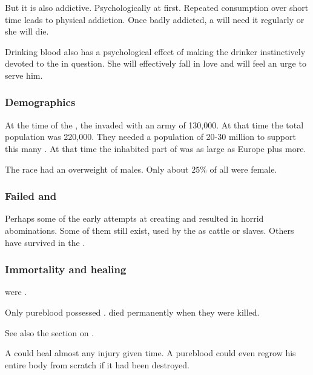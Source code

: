 But it is also addictive.
Psychologically at first.
Repeated consumption over short time leads to physical addiction.
Once badly addicted, a \human will need it regularly or she will die.

Drinking \resphan blood also has a psychological effect of making the drinker instinctively devoted to the \resphan in question.
She will effectively fall in love and will feel an urge to serve him.





\subsubsection{Demographics}
At the time of the , the \resphain invaded with an army of 130,000. 
At that time the total \resphan population was 220,000.
They needed a population of 20-30 million \humans to support this many \resphain.
At that time the inhabited part of \Nyx was as large as Europe plus more.

The race had an overweight of males. 
Only about $25\%$ of all \resphain were female. 





\subsubsection{Failed \resphain{} and \humans}
Perhaps some of the early attempts at creating \resphain{} and \humans{} resulted in horrid abominations. 
Some of them still exist, used by the \resphain{} as cattle or slaves. 
Others have survived in the . 





\subsubsection{Immortality and healing}
\Resphain were .

Only pureblood \resphain possessed .
\Ashenbloods died permanently when they were killed.

See also the section on . 

A \resphan could heal almost any injury given time. 
A pureblood could even regrow his entire body from scratch if it had been destroyed. 

